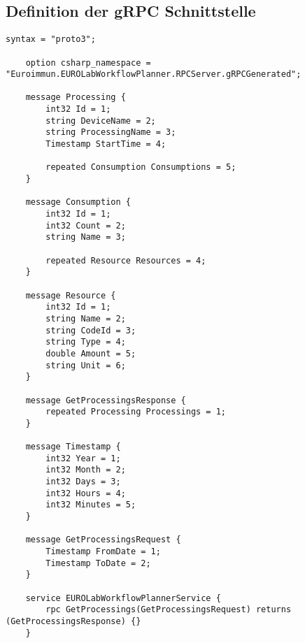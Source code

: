\subsection{Definition der gRPC Schnittstelle}
\label{app:DefinitionSchnittstelle}

\lstset{language=protobuf2, style=protobuf}
\begin{lstlisting}[caption={Definition der gRPC Schnittstelle}]
	syntax = "proto3";
	
	option csharp_namespace = "Euroimmun.EUROLabWorkflowPlanner.RPCServer.gRPCGenerated";
	
	message Processing {
		int32 Id = 1;
		string DeviceName = 2;
		string ProcessingName = 3;
		Timestamp StartTime = 4;
		
		repeated Consumption Consumptions = 5;
	}
	
	message Consumption {
		int32 Id = 1;
		int32 Count = 2;
		string Name = 3;
		
		repeated Resource Resources = 4;
	}
	
	message Resource {
		int32 Id = 1;
		string Name = 2;
		string CodeId = 3;
		string Type = 4;
		double Amount = 5;
		string Unit = 6;
	}
	
	message GetProcessingsResponse {
		repeated Processing Processings = 1;
	}
	
	message Timestamp {
		int32 Year = 1;
		int32 Month = 2;
		int32 Days = 3;
		int32 Hours = 4;
		int32 Minutes = 5;
	}
	
	message GetProcessingsRequest {
		Timestamp FromDate = 1;
		Timestamp ToDate = 2;
	}
	
	service EUROLabWorkflowPlannerService {
		rpc GetProcessings(GetProcessingsRequest) returns (GetProcessingsResponse) {}
	}
\end{lstlisting}